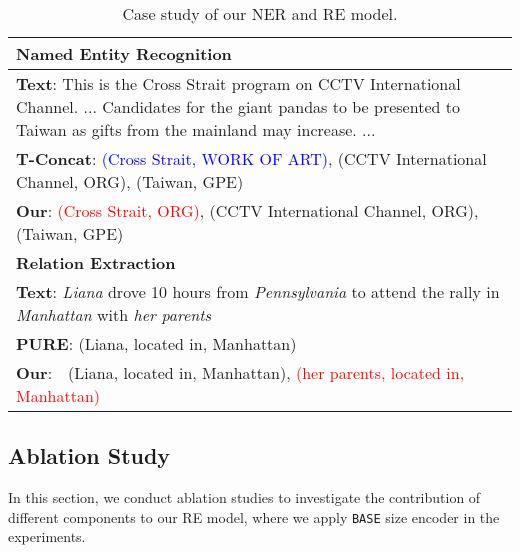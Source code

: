 \documentclass[11pt]{article}
\begin{document}
\begin{table}[!t]
\small


\centering
\begin{tabular}{p{}}
\toprule
\textbf{Named Entity Recognition} \\
\midrule
\textbf{Text}: This is the Cross Strait program on CCTV International Channel. ... Candidates for the giant pandas to be presented to Taiwan as gifts from the mainland may increase.  ...  \\
\textbf{T-Concat}: \textcolor{blue}{ (Cross Strait, WORK OF ART)}, (CCTV International Channel, ORG), (Taiwan, GPE)\\
\textbf{Our}: \textcolor{red}{(Cross Strait, ORG)}, (CCTV International Channel, ORG), (Taiwan, GPE)\\
\midrule
\textbf{Relation Extraction} \\
\midrule
\textbf{Text}: \emph{Liana} drove 10 hours from \emph{Pennsylvania} to attend the rally in \emph{Manhattan} with \emph{her parents} \\

\textbf{PURE}: (Liana, located in, Manhattan) \\
\textbf{Our}: \,\,\,\,{(Liana, located in, Manhattan),  \textcolor{red}{(her parents, located in, Manhattan)}} \\
\bottomrule
\end{tabular}
 \caption{Case study of our NER and RE model.}
 \label{tab:casestudy}


\end{table}

\subsection{Ablation Study}

In this section, we conduct ablation studies  to investigate the contribution of different components to our RE model, where we apply  \texttt{BASE} size encoder in the experiments.
\end{document}
